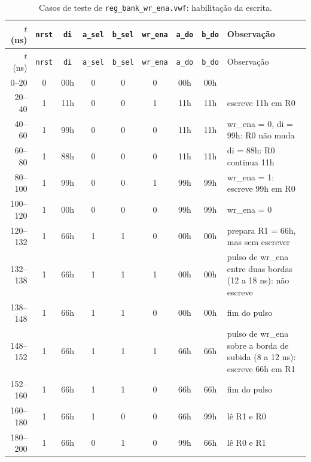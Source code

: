 {\scriptsize\setlength{\tabcolsep}{3pt}
\begin{longtable}{rcccccccp{5.3cm}}
\caption{Casos de teste de \texttt{reg\_bank\_wr\_ena.vwf}: habilitação da escrita.}
\label{tab:caso-reg-bank-wr-ena}\\
\hline $t$ (ns) & \texttt{nrst} & \texttt{di} & \texttt{a\_sel} & \texttt{b\_sel} & \texttt{wr\_ena} & \texttt{a\_do} & \texttt{b\_do} & Observação \\ \hline \endfirsthead
\hline $t$ (ns) & \texttt{nrst} & \texttt{di} & \texttt{a\_sel} & \texttt{b\_sel} & \texttt{wr\_ena} & \texttt{a\_do} & \texttt{b\_do} & Observação \\ \hline \endhead
0--20 & 0 & 00h & 0 & 0 & 0 & 00h & 00h &  \\
20--40 & 1 & 11h & 0 & 0 & 1 & 11h & 11h & escreve 11h em R0 \\
40--60 & 1 & 99h & 0 & 0 & 0 & 11h & 11h & wr\_ena = 0, di = 99h: R0 não muda \\
60--80 & 1 & 88h & 0 & 0 & 0 & 11h & 11h & di = 88h: R0 continua 11h \\
80--100 & 1 & 99h & 0 & 0 & 1 & 99h & 99h & wr\_ena = 1: escreve 99h em R0 \\
100--120 & 1 & 00h & 0 & 0 & 0 & 99h & 99h & wr\_ena = 0 \\
120--132 & 1 & 66h & 1 & 1 & 0 & 00h & 00h & prepara R1 = 66h, mas sem escrever \\
132--138 & 1 & 66h & 1 & 1 & 1 & 00h & 00h & pulso de wr\_ena entre duas bordas (12 a 18 ns): não escreve \\
138--148 & 1 & 66h & 1 & 1 & 0 & 00h & 00h & fim do pulso \\
148--152 & 1 & 66h & 1 & 1 & 1 & 66h & 66h & pulso de wr\_ena sobre a borda de subida (8 a 12 ns): escreve 66h em R1 \\
152--160 & 1 & 66h & 1 & 1 & 0 & 66h & 66h & fim do pulso \\
160--180 & 1 & 66h & 1 & 0 & 0 & 66h & 99h & lê R1 e R0 \\
180--200 & 1 & 66h & 0 & 1 & 0 & 99h & 66h & lê R0 e R1 \\
\hline
\end{longtable}}
\vspace{-0.9cm}
